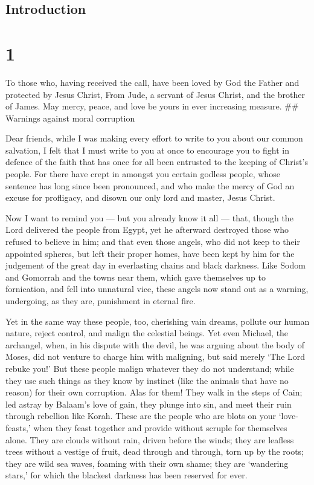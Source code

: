 \hypertarget{introduction}{%
\subsection{Introduction}\label{introduction}}

\hypertarget{section}{%
\section{1}\label{section}}

 To those who, having received the call, have been loved by
God the Father and protected by Jesus Christ, From Jude, a servant of
Jesus Christ, and the brother of James.  May mercy, peace,
and love be yours in ever increasing measure. \#\# Warnings against
moral corruption

 Dear friends, while I was making every effort to write to
you about our common salvation, I felt that I must write to you at once
to encourage you to fight in defence of the faith that has once for all
been entrusted to the keeping of Christ's people.  For there
have crept in amongst you certain godless people, whose sentence has
long since been pronounced, and who make the mercy of God an excuse for
profligacy, and disown our only lord and master, Jesus Christ.

 Now I want to remind you --- but you already know it all
--- that, though the Lord delivered the people from Egypt, yet he
afterward destroyed those who refused to believe in him; 
and that even those angels, who did not keep to their appointed spheres,
but left their proper homes, have been kept by him for the judgement of
the great day in everlasting chains and black darkness. 
Like Sodom and Gomorrah and the towns near them, which gave themselves
up to fornication, and fell into unnatural vice, these angels now stand
out as a warning, undergoing, as they are, punishment in eternal fire.

 Yet in the same way these people, too, cherishing vain
dreams, pollute our human nature, reject control, and malign the
celestial beings.  Yet even Michael, the archangel, when, in
his dispute with the devil, he was arguing about the body of Moses, did
not venture to charge him with maligning, but said merely `The Lord
rebuke you!'  But these people malign whatever they do not
understand; while they use such things as they know by instinct (like
the animals that have no reason) for their own corruption. 
Alas for them! They walk in the steps of Cain; led astray by Balaam's
love of gain, they plunge into sin, and meet their ruin through
rebellion like Korah.  These are the people who are blots
on your `love-feasts,' when they feast together and provide without
scruple for themselves alone. They are clouds without rain, driven
before the winds; they are leafless trees without a vestige of fruit,
dead through and through, torn up by the roots;  they are
wild sea waves, foaming with their own shame; they are `wandering
stars,' for which the blackest darkness has been reserved for ever.

